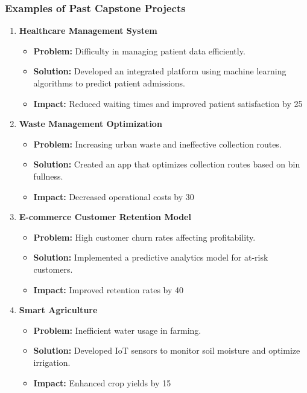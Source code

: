 \documentclass[aspectratio=169]{beamer}
\begin{document}
\begin{frame}[fragile]
    \frametitle{Examples of Past Capstone Projects}
    \begin{enumerate}
        \item \textbf{Healthcare Management System}
            \begin{itemize}
                \item \textbf{Problem:} Difficulty in managing patient data efficiently.
                \item \textbf{Solution:} Developed an integrated platform using machine learning algorithms to predict patient admissions.
                \item \textbf{Impact:} Reduced waiting times and improved patient satisfaction by 25%
            \end{itemize}
        
        \item \textbf{Waste Management Optimization}
            \begin{itemize}
                \item \textbf{Problem:} Increasing urban waste and ineffective collection routes.
                \item \textbf{Solution:} Created an app that optimizes collection routes based on bin fullness.
                \item \textbf{Impact:} Decreased operational costs by 30%
            \end{itemize}

        \item \textbf{E-commerce Customer Retention Model}
            \begin{itemize}
                \item \textbf{Problem:} High customer churn rates affecting profitability.
                \item \textbf{Solution:} Implemented a predictive analytics model for at-risk customers.
                \item \textbf{Impact:} Improved retention rates by 40%
            \end{itemize}

        \item \textbf{Smart Agriculture}
            \begin{itemize}
                \item \textbf{Problem:} Inefficient water usage in farming.
                \item \textbf{Solution:} Developed IoT sensors to monitor soil moisture and optimize irrigation.
                \item \textbf{Impact:} Enhanced crop yields by 15%
            \end{itemize}
    \end{enumerate}
\end{frame}
\end{document}

